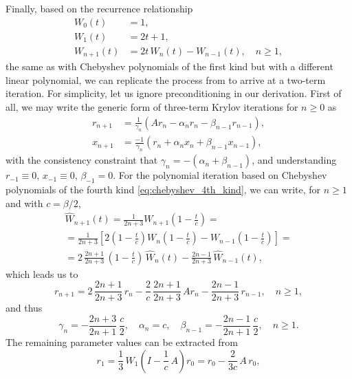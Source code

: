 \documentclass[a4paper]{article}
\theoremstyle{plain}
\theoremstyle{definition}
\theoremstyle{remark}
\begin{document}
Finally, based on the recurrence relationship
\begin{align*}
	W_0(t) &= 1,\\
	W_1(t) &= 2t + 1,\\
	W_{n+1}(t) &= 2t\, W_n(t) - W_{n-1}(t), \quad n \geq 1,
\end{align*}
the same as with Chebyshev polynomials of the first kind but with a different linear polynomial, we can replicate the process from \cite{Gutknecht2002} to arrive at a two-term iteration. For simplicity, let us ignore preconditioning in our derivation. First of all, we may write the generic form of three-term Krylov iterations for \(n \geq 0\) as
\begin{equation*}
	\begin{aligned}
		r_{n+1} &= \frac{1}{\gamma_n} (A r_n - \alpha_n r_n - \beta_{n-1} r_{n-1}),\\
		x_{n+1} &= \frac{-1}{\gamma_n} (r_n + \alpha_n x_n + \beta_{n-1} x_{n-1}),
	\end{aligned}
\end{equation*}
with the consistency constraint that \(\gamma_n = -(\alpha_n + \beta_{n-1})\), and understanding \(r_{-1} \equiv 0\), \(x_{-1} \equiv 0\), \(\beta_{-1} = 0\). For the polynomial iteration based on Chebyshev polynomials of the fourth kind \eqref{eq:chebyshev_4th_kind}, we can write, for \(n \geq 1\) and with \(c = \beta / 2\),
\begin{multline*}
	\hat{W}_{n+1}(t) = \frac{1}{2n+3} W_{n+1}\left( 1 - \frac{t}{c} \right) =\\
	= \frac{1}{2n+3} \left[ 2 \left( 1 - \frac{t}{c} \right) W_{n}\left( 1 - \frac{t}{c} \right) - W_{n-1}\left( 1 - \frac{t}{c} \right) \right] =\\
	= 2\, \frac{2n+1}{2n+3} \, \left( 1 - \frac{t}{c} \right)\, \hat{W}_{n}(t) - \frac{2n-1}{2n+3} \, \hat{W}_{n-1}(t),
\end{multline*}
which leads us to
\begin{equation*}
	r_{n+1} = 2\, \frac{2n+1}{2n+3}\, r_n - \frac{2}{c}\, \frac{2n+1}{2n+3} \, A r_n - \frac{2n-1}{2n+3}\, r_{n-1}, \quad n \geq 1,
\end{equation*}
and thus
\begin{equation*}
	\gamma_n = - \frac{2n+3}{2n+1} \, \frac{c}{2}, \quad \alpha_n = c, \quad \beta_{n-1} = - \frac{2n-1}{2n+1} \, \frac{c}{2}, \quad n\geq 1.
\end{equation*}
The remaining parameter values can be extracted from
\begin{equation*}
	r_{1} = \frac{1}{3}\,  W_{1}\left( I - \frac{1}{c} \, A \right) r_0 = r_0 - \frac{2}{3c} \, A \, r_0,
\end{equation*}
\end{document}
